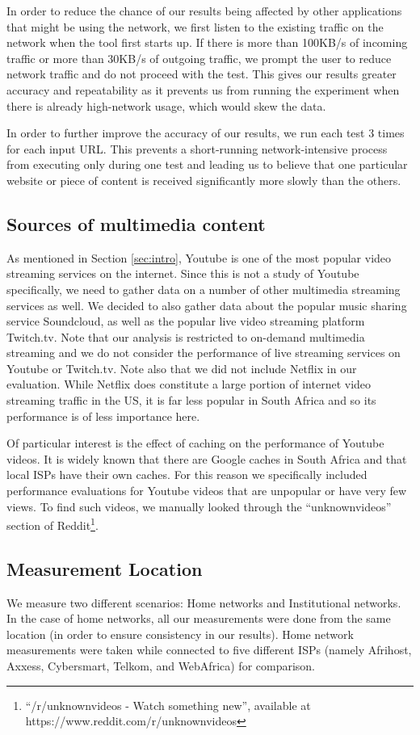 \documentclass{sig-alternate-05-2015}
\begin{document}
In order to reduce the chance of our results being affected by other applications that might be using the network, we first listen to the existing traffic on the network when the tool first starts up. If there is more than 100KB/s of incoming traffic or more than 30KB/s of outgoing traffic, we prompt the user to reduce network traffic and do not proceed with the test. This gives our results greater accuracy and repeatability as it prevents us from running the experiment when there is already high-network usage, which would skew the data.

In order to further improve the accuracy of our results, we run each test 3 times for each input URL. This prevents a short-running network-intensive process from executing only during one test and leading us to believe that one particular website or piece of content is received significantly more slowly than the others.

\subsection{Sources of multimedia content}
As mentioned in Section \ref{sec:intro}, Youtube is one of the most popular video streaming services on the internet. Since this is not a study of Youtube specifically, we need to gather data on a number of other multimedia streaming services as well. We decided to also gather data about the popular music sharing service Soundcloud, as well as the popular live video streaming platform Twitch.tv. Note that our analysis is restricted to on-demand multimedia streaming and we do not consider the performance of live streaming services on Youtube or Twitch.tv. Note also that we did not include Netflix in our evaluation. While Netflix does constitute a large portion of internet video streaming traffic in the US, it is far less popular in South Africa and so its performance is of less importance here.

Of particular interest is the effect of caching on the performance of Youtube videos. It is widely known that there are Google caches in South Africa and that local ISPs have their own caches. For this reason we specifically included performance evaluations for Youtube videos that are unpopular or have very few views. To find such videos, we manually looked through the ``unknownvideos'' section of Reddit\footnote{``/r/unknownvideos - Watch something new'', available at https://www.reddit.com/r/unknownvideos}.

\subsection{Measurement Location}
We measure two different scenarios: Home networks and Institutional networks. In the case of home networks, all our measurements were done from the same location (in order to ensure consistency in our results). Home network measurements were taken while connected to five different ISPs (namely Afrihost, Axxess, Cybersmart, Telkom, and WebAfrica) for comparison.
\end{document}
